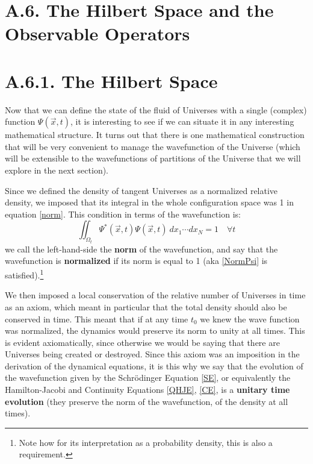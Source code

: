 \documentclass[11pt, a4paper]{article} %
\begin{document}
\newpage
{}
\section*{A.6. The Hilbert Space and the Observable Operators}

\section*{A.6.1. The Hilbert Space}

Now that we can define the state of the fluid of Universes with a single (complex) function $\Psi(\vec{x},t)$, it is interesting to see if we can situate it in any interesting mathematical structure. It turns out that there is one mathematical construction that will be very convenient to manage the wavefunction of the Universe (which will be extensible to the wavefunctions of partitions of the Universe that we will explore in the next section).

Since we defined the density of tangent Universes as a normalized relative density, we imposed that its integral in the whole configuration space was 1 in equation \eqref{norm}. This condition in terms of the wavefunction is:
\begin{equation}\label{NormPsi}
\iint_{\Omega_t}\Psi^*(\vec{x},t)\Psi(\vec{x},t)\ dx_1\cdots dx_N=1\quad \forall t
\end{equation}
we call the left-hand-side the {\bf norm} of the wavefunction, and say that the wavefunction is {\bf normalized} if its norm is equal to 1 (aka \eqref{NormPsi} is satisfied).\footnote{Note how for its interpretation as a probability density, this is also a requirement.}

We then imposed a local conservation of the relative number of Universes in time as an axiom, which meant in particular that the total density should also be conserved in time. This meant that if at any time $t_0$ we knew the wave function was normalized, the dynamics would preserve its norm to unity at all times. This is evident axiomatically, since otherwise we would be saying that there are Universes being created or destroyed. Since this axiom was an imposition in the derivation of the dynamical equations, it is this why we say that the evolution of the wavefunction given by the Schrödinger Equation \eqref{SE}, or equivalently the Hamilton-Jacobi and Continuity Equations \eqref{QHJE}, \eqref{CE}, is a {\bf unitary time evolution} (they preserve the norm of the wavefunction, of the density at all times).
\end{document}
